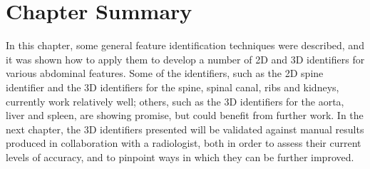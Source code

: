 \afterpage{\clearpage}
\newpage

\section{Chapter Summary}

In this chapter, some general feature identification techniques were described, and it was shown how to apply them to develop a number of 2D and 3D identifiers for various abdominal features. 
%
\noindent Some of the identifiers, such as the 2D spine identifier and the 3D identifiers for the spine, spinal canal, ribs and kidneys, currently work relatively well; others, such as the 3D identifiers for the aorta, liver and spleen, are showing promise, but could benefit from further work. In the next chapter, the 3D identifiers presented will be validated against manual results produced in collaboration with a radiologist, both in order to assess their current levels of accuracy, and to pinpoint ways in which they can be further improved.